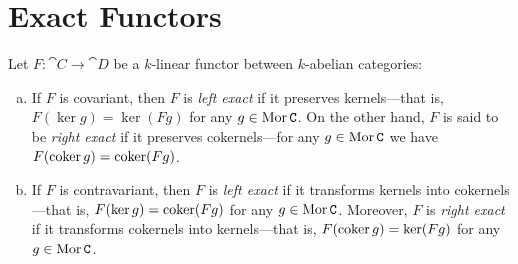 \section{Exact Functors}

\begin{proposition}
    \label{prop:abelian-cat-left-right-exact-functors}
    Let \(F: \cat C \to \cat D\) be a \(k\)-linear functor between \(k\)-abelian
    categories:
    \begin{enumerate}[(a)]\setlength\itemsep{0em}
        \item If \(F\) is covariant, then \(F\) is \emph{left exact} if it preserves
              kernels---that is, \(F(\ker g) = \ker(F g)\) for any \(g \in \operatorname{Mor} \texttt C\). On the
              other hand, \(F\) is said to be \emph{right exact} if it preserves
              cokernels---for any \(g \in \operatorname{Mor} \texttt C\) we have \(F(\operatorname{coker} g) = \operatorname{coker}(F g)\).

        \item If \(F\) is contravariant, then \(F\) is \emph{left exact} if it
              transforms kernels into cokernels---that is, \(F(\ker g) = \operatorname{coker}(F g)\) for any
              \(g \in \operatorname{Mor} \texttt C\). Moreover, \(F\) is \emph{right exact} if it transforms
              cokernels into kernels---that is, \(F(\operatorname{coker} g) = \ker(F g)\) for any
              \(g \in \operatorname{Mor} \texttt C\).
    \end{enumerate}
\end{proposition}


